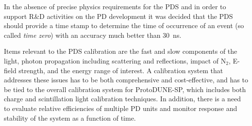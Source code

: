 
 In the absence of precise physics requirements for the PDS and in order to support R\&D activities on the PD development it was decided that the PDS should provide a time stamp to determine the time of occurrence of an event (so called \textit{time zero}) with an accuracy much better than 30~ns.

		Items relevant to the PDS calibration are the fast and slow components of the light, photon propagation including scattering and reflections, impact of N$_2$, E-field strength, 
and the energy range of interest. A calibration system that addresses these issues has to be both comprehensive and cost-effective, and has to be tied to the overall 
calibration system for ProtoDUNE-SP, which includes both charge and scintillation light calibration techniques. 
In addition, there is a need to evaluate relative efficiencies of multiple PD units and monitor response and stability of the system as a function of time.

